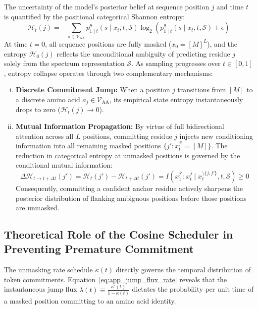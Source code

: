 The uncertainty of the model's posterior belief at sequence position $j$ and time $t$ is quantified by the positional categorical Shannon entropy:
\begin{equation}
\mathcal{H}_t(j) = - \sum_{s \in \mathcal{V}_{\text{AA}}} p_{1 \mid t}^\theta(s \mid x_t, t, \mathcal{S}) \log_2 \left( p_{1 \mid t}^\theta(s \mid x_t, t, \mathcal{S}) + \epsilon \right)
\label{eq:app_shannon_entropy}
\end{equation}
At time $t = 0$, all sequence positions are fully masked ($x_0 = [M]^L$), and the entropy $\mathcal{H}_0(j)$ reflects the unconditional ambiguity of predicting residue $j$ solely from the spectrum representation $\mathcal{S}$. As sampling progresses over $t \in [0, 1]$, entropy collapse operates through two complementary mechanisms:
\begin{enumerate}[(i)]
\item \textbf{Discrete Commitment Jump:} When a position $j$ transitions from $[M]$ to a discrete amino acid $a_j \in \mathcal{V}_{\text{AA}}$, its empirical state entropy instantaneously drops to zero ($\mathcal{H}_t(j) \to 0$).
\item \textbf{Mutual Information Propagation:} By virtue of full bidirectional attention across all $L$ positions, committing residue $j$ injects new conditioning information into all remaining masked positions $\{j' : x_t^{j'} = [M]\}$. The reduction in categorical entropy at unmasked positions is governed by the conditional mutual information:
\begin{equation}
\Delta \mathcal{H}_{t \to t+\Delta t}(j') = \mathcal{H}_t(j') - \mathcal{H}_{t+\Delta t}(j') = I(x_1^{j'} ; x_t^j \mid x_t^{\setminus \{j, j'\}}, t, \mathcal{S}) \ge 0
\end{equation}
Consequently, committing a confident anchor residue actively sharpens the posterior distribution of flanking ambiguous positions before those positions are unmasked.
\end{enumerate}

\subsection{Theoretical Role of the Cosine Scheduler in Preventing Premature Commitment}
\label{subsec:app_cosine_role}

The unmasking rate schedule $\kappa(t)$ directly governs the temporal distribution of token commitments. Equation~\ref{eq:app_jump_flux_rate} reveals that the instantaneous jump flux $\lambda(t) \equiv \frac{\kappa'(t)}{1 - \kappa(t)}$ dictates the probability per unit time of a masked position committing to an amino acid identity.

